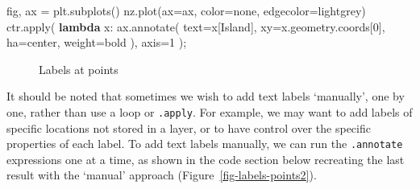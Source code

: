 \documentclass[
  letterpaper,
]{krantz}
\newenvironment{Shaded}{\begin{snugshade}}{\end{snugshade}}
\newcommand{\BuiltInTok}[1]{\textcolor[rgb]{0.00,0.23,0.31}{#1}}
\newcommand{\DecValTok}[1]{\textcolor[rgb]{0.68,0.00,0.00}{#1}}
\newcommand{\KeywordTok}[1]{\textcolor[rgb]{0.00,0.23,0.31}{\textbf{#1}}}
\newcommand{\NormalTok}[1]{\textcolor[rgb]{0.00,0.23,0.31}{#1}}
\newcommand{\OperatorTok}[1]{\textcolor[rgb]{0.37,0.37,0.37}{#1}}
\newcommand{\StringTok}[1]{\textcolor[rgb]{0.13,0.47,0.30}{#1}}
\begin{document}
\begin{Shaded}
\begin{Highlighting}[]
\NormalTok{fig, ax }\OperatorTok{=}\NormalTok{ plt.subplots()}
\NormalTok{nz.plot(ax}\OperatorTok{=}\NormalTok{ax, color}\OperatorTok{=}\StringTok{\textquotesingle{}none\textquotesingle{}}\NormalTok{, edgecolor}\OperatorTok{=}\StringTok{\textquotesingle{}lightgrey\textquotesingle{}}\NormalTok{)}
\NormalTok{ctr.}\BuiltInTok{apply}\NormalTok{(}
    \KeywordTok{lambda}\NormalTok{ x: ax.annotate(}
\NormalTok{        text}\OperatorTok{=}\NormalTok{x[}\StringTok{\textquotesingle{}Island\textquotesingle{}}\NormalTok{], }
\NormalTok{        xy}\OperatorTok{=}\NormalTok{x.geometry.coords[}\DecValTok{0}\NormalTok{], }
\NormalTok{        ha}\OperatorTok{=}\StringTok{\textquotesingle{}center\textquotesingle{}}\NormalTok{,}
\NormalTok{        weight}\OperatorTok{=}\StringTok{\textquotesingle{}bold\textquotesingle{}}
\NormalTok{    ), }
\NormalTok{    axis}\OperatorTok{=}\DecValTok{1}
\NormalTok{)}\OperatorTok{;}
\end{Highlighting}
\end{Shaded}

\begin{figure}[H]


\caption{\label{fig-labels-points1}Labels at points}

\end{figure}%

It should be noted that sometimes we wish to add text labels `manually',
one by one, rather than use a loop or \texttt{.apply}. For example, we
may want to add labels of specific locations not stored in a layer, or
to have control over the specific properties of each label. To add text
labels manually, we can run the \texttt{.annotate} expressions one at a
time, as shown in the code section below recreating the last result with
the `manual' approach (Figure~\ref{fig-labels-points2}).
\end{document}
